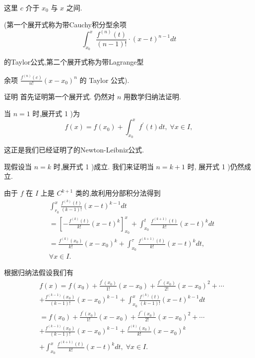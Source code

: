 这里 $c$ 介于 ${x}_{0}$ 与 $x$ 之间.

(第一个展开式称为带Cauchy积分型余项
$${\int }_{{x}_{0}}^{x}\frac{{f}^{\left( n\right) }\left( t\right) }{\left( {n - 1}\right) !} \cdot  {\left( x - t\right) }^{n - 1}{dt}$$

的Taylor公式,第二个展开式称为带Lagrange型

余项 $\frac{{f}^{\left( n\right) }\left( c\right) }{n!}{\left( x - {x}_{0}\right) }^{n}$ 的 Taylor 公式).

证明 首先证明第一个展开式. 仍然对 $n$ 用数学归纳法证明.

当 $n = 1$ 时,展开式 1 )为
$$f\left( x\right)  = f\left( {x}_{0}\right)  + {\int }_{{x}_{0}}^{x}{f}^{\prime }\left( t\right) {dt},\;\forall x \in  I,$$

这正是我们已经证明了的Newton-Leibniz公式.

现假设当 $n = k$ 时,展开式 1 )成立. 我们来证明当 $n = k + 1$ 时, 展开式 1 )仍然成立.

由于 $f$ 在 $I$ 上是 ${C}^{k + 1}$ 类的,故利用分部积分法得到
\begin{align*}
	&{\int }_{{r}_{0}}^{x}\frac{{f}^{\left( k\right) }\left( t\right) }{\left( {k - 1}\right) !}{\left( x - t\right) }^{k - 1}{dt}\\
	&= {\left\lbrack  -\frac{{f}^{\left( k\right) }\left( t\right) }{k!}{\left( x - t\right) }^{k}\right\rbrack  }_{{x}_{0}}^{x} + {\int }_{{x}_{0}}^{t}\frac{{f}^{\left( k + 1\right) }\left( t\right) }{k!}{\left( x - t\right) }^{k}{dt}\\
	&= \frac{{f}^{\left( k\right) }\left( {x}_{0}\right) }{k!}{\left( x - {x}_{0}\right) }^{k} + {\int }_{{x}_{0}}^{\tau }\frac{{f}^{\left( k + 1\right) }\left( t\right) }{k!}{\left( x - t\right) }^{k}{dt},\\
	&\forall x \in  I.
\end{align*}

根据归纳法假设我们有
\begin{align*}
	&f\left( x\right)  = f\left( {x}_{0}\right)  + \frac{{f}^{\prime }\left( {x}_{0}\right) }{1!}\left( {x - {x}_{0}}\right)  + \frac{{f}^{\prime \prime }\left( {x}_{0}\right) }{2!}{\left( x - {x}_{0}\right) }^{2} + \cdots\\
	&+ \frac{{f}^{\left( k - 1\right) }\left( {x}_{0}\right) }{\left( {k - 1}\right) !}{\left( x - {x}_{0}\right) }^{k - 1} + {\int }_{{x}_{0}}^{x}\frac{{f}^{\left( k\right) }\left( t\right) }{\left( {k - 1}\right) !}{\left( x - t\right) }^{k - 1}{dt}\\
	&= f\left( {x}_{0}\right)  + \frac{{f}^{\prime }\left( {x}_{0}\right) }{1!}\left( {x - {x}_{0}}\right)  + \frac{{f}^{\prime \prime }\left( {x}_{0}\right) }{2!}{\left( x - {x}_{0}\right) }^{2} + \cdots\\
	&+ \frac{{f}^{\left( k - 1\right) }\left( {x}_{0}\right) }{\left( {k - 1}\right) !}{\left( x - {x}_{0}\right) }^{k - 1} + \frac{{f}^{\left( k\right) }\left( {x}_{0}\right) }{k!}{\left( x - {x}_{0}\right) }^{k}\\
	&+ {\int }_{{x}_{0}}^{x}\frac{{f}^{\left( k + 1\right) }\left( t\right) }{k!}{\left( x - t\right) }^{k}{dt},\;\forall x \in  I.
\end{align*}

